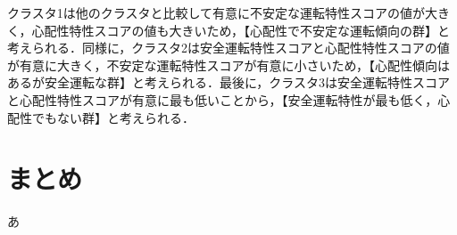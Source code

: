\documentclass[twocolumn,a4j]{jarticle}
\begin{document}
クラスタ1は他のクラスタと比較して有意に不安定な運転特性スコアの値が大きく，心配性特性スコアの値も大きいため，【心配性で不安定な運転傾向の群】と考えられる．同様に，クラスタ2は安全運転特性スコアと心配性特性スコアの値が有意に大きく，不安定な運転特性スコアが有意に小さいため，【心配性傾向はあるが安全運転な群】と考えられる．最後に，クラスタ3は安全運転特性スコアと心配性特性スコアが有意に最も低いことから，【安全運転特性が最も低く，心配性でもない群】と考えられる．

\section{まとめ}
あ

\vspace*{-0.55cm}
\small
\end{document}
